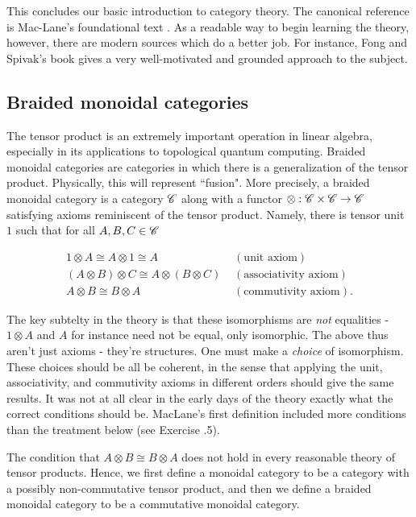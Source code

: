 \documentclass{article}
\theoremstyle{definition}
\numberwithin{figure}{section}
\begin{document}
This concludes our basic introduction to category theory. The canonical reference is Mac-Lane's foundational text \cite{mac2013categories}. As a readable way to begin learning the theory, however, there are modern sources which do a better job. For instance, Fong and Spivak's book \cite{fong2019invitation} gives a very well-motivated and grounded approach to the subject.

\subsection{Braided monoidal categories}
\label{Braided monoidal categories}

The tensor product is an extremely important operation in linear algebra, especially in its applications to topological quantum computing. Braided monoidal categories are categories in which there is a generalization of the tensor product. Physically, this will represent ``fusion". More precisely, a braided monoidal category is a category $\mathscr{C}$  along with a functor $\otimes : \mathscr{C}\times \mathscr{C}\to \mathscr{C}$ satisfying axioms reminiscent of the tensor product. Namely, there is tensor unit $1$ such that for all $A,B,C\in \mathscr{C}$

\begin{align*}
1\otimes A\cong A\otimes 1\cong A \,\, &(\text{unit axiom})\\
(A\otimes B)\otimes C \cong A\otimes (B\otimes C)\,\, &(\text{associativity axiom})\\
A\otimes B \cong B\otimes A\,\, &(\text{commutivity axiom}).
\end{align*}

The key subtelty in the theory is that these isomorphisms are \textit{not} equalities -  $1\otimes A$ and $A$ for instance need not be equal, only isomorphic. The above thus aren't just axioms - they're structures. One must make a \textit{choice} of isomorphism. These choices should be all be coherent, in the sense that applying the unit, associativity, and commutivity axioms in different orders should give the same results. It was not at all clear in the early days of the theory exactly what the correct conditions should be. MacLane's first definition included more conditions than the treatment below (see Exercise \thesection.5).

The condition that $A\otimes B\cong B\otimes A$ does not hold in every reasonable theory of tensor products. Hence, we first define a monoidal category to be a category with a possibly non-commutative tensor product, and then we define a braided monoidal category to be a commutative monoidal category.
\end{document}
